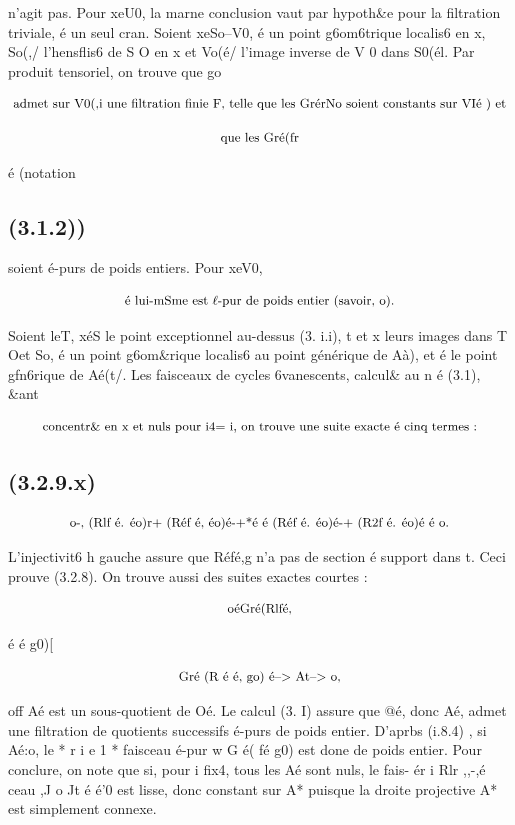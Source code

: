 \documentclass[11pt]{article}
\theoremstyle{remark}
\begin{document}
n'agit pas. Pour xeU0, la marne conclusion vaut par hypoth\&e pour la filtration triviale, é un seul cran. Soient xeSo--V0, é un point g6om6trique localis6 en x, So(,/ l'hensflis6 de S O en x et Vo(é/ l'image inverse de V 0 dans S0(él. Par produit tensoriel, on trouve que go

\[\text{\small admet sur V0(,i une filtration finie F, telle que les GrérNo soient constants sur VIé ) et}\]

\[\text{\small que les Gré(fr}\]

é (notation

\subsection*{(3.1.2))}

soient é-purs de poids entiers. Pour xeV0,

\[\text{\small é lui-mSme est \(\ell\)-pur de poids entier (savoir, o).}\]

Soient leT, xéS le point exceptionnel au-dessus (3. i.i), t et x leurs images dans T Oet So, é un point g6om\&rique localis6 au point générique de Aà), et é le point gfn6rique de Aé(t/. Les faisceaux de cycles 6vanescents, calcul\& au n é (3.1), \&ant

\[\text{\small concentr\& en x et nuls pour i4= i, on trouve une suite exacte é cinq termes :}\]

\subsection*{(3.2.9.x)}

\[\text{\small o-, (Rlf é. éo)r+ (Réf é, éo)é-+*é é (Réf é. éo)é-+ (R2f é. éo)é é o.}\]

L'injectivit6 h gauche assure que Réfé,g n'a pas de section é support dans t. Ceci prouve (3.2.8). On trouve aussi des suites exactes courtes :

\[\text{\small oéGré(Rlfé,}\]

é é g0)[

\[\text{\small Gré (R é é, go) é--> At--> o,}\]

off Aé est un sous-quotient de Oé. Le calcul (3. I) assure que @é, donc Aé, admet une filtration de quotients successifs é-purs de poids entier. D'aprbs (i.8.4) , si Aé:o, le * r i e 1 * faisceau é-pur w G é( fé g0) est done de poids entier. Pour conclure, on note que si, pour i fix4, tous les Aé sont nuls, le fais- ér i Rlr ,,-,é ceau ,J o Jt é é'0 est lisse, donc constant sur A* puisque la droite projective A* est simplement connexe.
\end{document}
